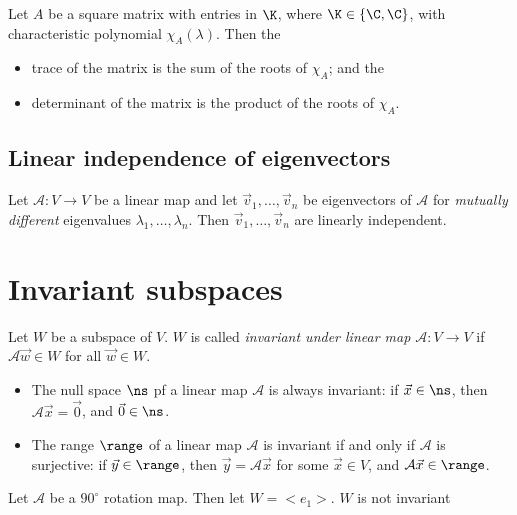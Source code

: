 \begin{theorem}
    Let $A$ be a square matrix with entries in $\K$, where $\K \in \{\C, \C\}$, with characteristic polynomial $\chi_A(\lambda)$. Then the
    \begin{itemize}
        \item trace of the matrix is the sum of the roots of $\chi_A$; and the
        \item determinant of the matrix is the product of the roots of $\chi_A$.
    \end{itemize}
\end{theorem}

\subsection{Linear independence of eigenvectors}
\begin{theorem}
    Let $\mathcal{A}: V \to V$ be a linear map and let $\vec{v}_1, \dots, \vec{v}_n$ be eigenvectors of $\mathcal{A}$ for \emph{mutually different} eigenvalues
    $\lambda_1, \dots, \lambda_n$. Then $\vec{v}_1, \dots, \vec{v}_n$ are linearly independent.
\end{theorem}

\section{Invariant subspaces}
\begin{definition}
    Let $W$ be a subspace of $V$. $W$ is called \emph{invariant under linear map $\mathcal{A}: V \to V$} if $\mathcal{A}\vec{w} \in W$ for all $\vec{w} \in W$.
\end{definition}

\begin{example}
    \begin{itemize}
        \item The null space $\ns$ pf a linear map $\mathcal{A}$ is always invariant: if $\vec{x} \in \ns$, then $\mathcal{A}\vec{x} = \vec{0}$,
            and $\vec{0} \in \ns$.
        \item The range $\range$ of a linear map $\mathcal{A}$ is invariant if and only if $\mathcal{A}$ is surjective: if $\vec{y} \in \range$,
            then $\vec{y} = \mathcal{A}\vec{x}$ for some $\vec{x} \in V$, and $\mathcal{A}\vec{x} \in \range$.
    \end{itemize}
\end{example}

\begin{example}
    Let $\mathcal{A}$ be a $90^\circ$ rotation map. Then let $W = <e_1>$. $W$ is not invariant
\end{example}

